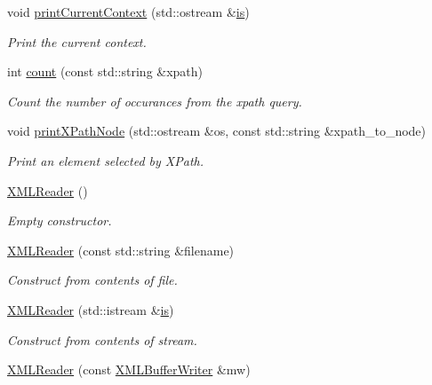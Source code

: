 \begin{DoxyCompactItemize}
void \mbox{\hyperlink{classADATXML_1_1XMLReader_a424f9e30746b4fdc106b57b5ce95f7ec}{print\+Current\+Context}} (std\+::ostream \&\mbox{\hyperlink{x_8cc_a81abbbdef81e25584a2eab888e643d3d}{is}})
\begin{DoxyCompactList}\small\item\em Print the current context. \end{DoxyCompactList}\item 
int \mbox{\hyperlink{classADATXML_1_1XMLReader_a59584913f1338d956de60adef16a0718}{count}} (const std\+::string \&xpath)
\begin{DoxyCompactList}\small\item\em Count the number of occurances from the xpath query. \end{DoxyCompactList}\item 
void \mbox{\hyperlink{classADATXML_1_1XMLReader_ae1bbeacb282c3e9b33750d36aea11d32}{print\+X\+Path\+Node}} (std\+::ostream \&os, const std\+::string \&xpath\+\_\+to\+\_\+node)
\begin{DoxyCompactList}\small\item\em Print an element selected by X\+Path. \end{DoxyCompactList}\item 
\mbox{\hyperlink{classADATXML_1_1XMLReader_a1934189445871612ae9b93f35e17c468}{X\+M\+L\+Reader}} ()
\begin{DoxyCompactList}\small\item\em Empty constructor. \end{DoxyCompactList}\item 
\mbox{\hyperlink{classADATXML_1_1XMLReader_a85d8af8a27febdd66251e20bd96ccc32}{X\+M\+L\+Reader}} (const std\+::string \&filename)
\begin{DoxyCompactList}\small\item\em Construct from contents of file. \end{DoxyCompactList}\item 
\mbox{\hyperlink{classADATXML_1_1XMLReader_a8025cb1c53d6ceb8a694bdbd8e1f383b}{X\+M\+L\+Reader}} (std\+::istream \&\mbox{\hyperlink{x_8cc_a81abbbdef81e25584a2eab888e643d3d}{is}})
\begin{DoxyCompactList}\small\item\em Construct from contents of stream. \end{DoxyCompactList}\item 
\mbox{\hyperlink{classADATXML_1_1XMLReader_a6829255c2dd448f4bf315f6fd0b380a1}{X\+M\+L\+Reader}} (const \mbox{\hyperlink{classADATXML_1_1XMLBufferWriter}{X\+M\+L\+Buffer\+Writer}} \&mw)

\end{DoxyCompactItemize}
